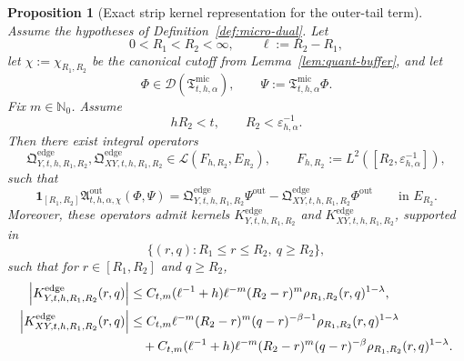 \documentclass[11pt,a4paper]{amsart}
\theoremstyle{plain}
\newtheorem{proposition}[theorem]{Proposition}
\theoremstyle{definition}
\theoremstyle{remark}
\newcommand{\one}{\mathbf 1}
\begin{document}
\begin{proposition}[Exact strip kernel representation for the outer-tail term]
\label{prop:edge-strip-kernel}
Assume the hypotheses of Definition~\ref{def:micro-dual}. Let
\[
0<R_1<R_2<\infty,
\qquad
\ell:=R_2-R_1,
\]
let \(\chi:=\chi_{R_1,R_2}\) be the canonical cutoff from Lemma~\ref{lem:quant-buffer}, and let
\[
\Phi\in\mathcal D(\mathfrak T_{t,h,\alpha}^{\mathrm{mic}}),
\qquad
\Psi:=\mathfrak T_{t,h,\alpha}^{\mathrm{mic}}\Phi.
\]
Fix \(m\in\mathbb N_0\). Assume
\[
hR_2<t,
\qquad
R_2<\varepsilon_{h,\alpha}^{-1}.
\]
Then there exist integral operators
\[
\mathfrak Q_{Y,t,h,R_1,R_2}^{\mathrm{edge}},
\mathfrak Q_{XY,t,h,R_1,R_2}^{\mathrm{edge}}
\in \mathcal L(F_{h,R_2},E_{R_2}),
\qquad
F_{h,R_2}:=L^2([R_2,\varepsilon_{h,\alpha}^{-1}]),
\]
such that
\begin{equation}\label{eq:edge-strip-identity}
\one_{[R_1,R_2]}
\mathfrak A_{t,h,\alpha,\chi}^{\mathrm{out}}(\Phi,\Psi)
=
\mathfrak Q_{Y,t,h,R_1,R_2}^{\mathrm{edge}}\Psi^{\mathrm{out}}
-
\mathfrak Q_{XY,t,h,R_1,R_2}^{\mathrm{edge}}\Phi^{\mathrm{out}}
\qquad\text{in }E_{R_2}.
\end{equation}
Moreover, these operators admit kernels \(K_{Y,t,h,R_1,R_2}^{\mathrm{edge}}\) and
\(K_{XY,t,h,R_1,R_2}^{\mathrm{edge}}\), supported in
\[
\{(r,q): R_1\le r\le R_2,\ q\ge R_2\},
\]
such that for \(r\in[R_1,R_2]\) and \(q\ge R_2\),
\begin{align}
\left|
K_{Y,t,h,R_1,R_2}^{\mathrm{edge}}(r,q)
\right|
&\le
C_{t,m}(\ell^{-1}+h)\ell^{-m}(R_2-r)^m\rho_{R_1,R_2}(r,q)^{1-\lambda},
\label{eq:edge-strip-Y}\\
\left|
K_{XY,t,h,R_1,R_2}^{\mathrm{edge}}(r,q)
\right|
&\le
C_{t,m}\ell^{-m}(R_2-r)^m(q-r)^{-\beta-1}\rho_{R_1,R_2}(r,q)^{1-\lambda}
\notag\\
&\quad+
C_{t,m}(\ell^{-1}+h)\ell^{-m}(R_2-r)^m(q-r)^{-\beta}\rho_{R_1,R_2}(r,q)^{1-\lambda}.
\label{eq:edge-strip-XY}
\end{align}
\end{proposition}
\end{document}
